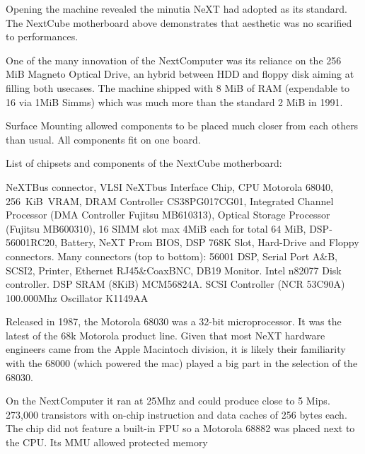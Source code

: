 \par
Opening the machine revealed the minutia NeXT had adopted as its standard. The NextCube motherboard above demonstrates that aesthetic was no scarified to performances.\\
\par
One of the many innovation of the NextComputer was its reliance on the 256 MiB Magneto Optical Drive, an hybrid between HDD and floppy disk aiming at filling both usecases. The machine shipped with 8 MiB of RAM (expendable to 16 via 1MiB Simms) which was much more than the standard 2 MiB in 1991.\\
\par
Surface Mounting allowed components to be placed much closer from each others than usual. All components fit on one board.

\vspace{50 mm}
\par
List of chipsets and components of the NextCube motherboard:\\
\par 
{} NeXTBus connector,
 VLSI NeXTbus Interface Chip,
 CPU Motorola 68040,
 256~KiB~VRAM,
 DRAM Controller CS38PG017CG01,
 Integrated Channel Processor (DMA Controller Fujitsu MB610313),
 Optical Storage Processor (Fujitsu MB600310),
 16 SIMM slot max 4MiB each for total 64 MiB,
 DSP-56001RC20,
 Battery,
 NeXT Prom BIOS,
 DSP 768K Slot,
 Hard-Drive and Floppy connectors.
 Many connectors (top to bottom): 56001 DSP, Serial Port A\&B, SCSI2, Printer, Ethernet RJ45\&CoaxBNC, DB19 Monitor. 
 Intel n82077 Disk controller.
 DSP SRAM (8KiB) MCM56824A.
 SCSI Controller (NCR 53C90A)
 100.000Mhz Oscillator K1149AA



\begin{figure}[H]
\centering
{}
\end{figure}
Released in 1987, the Motorola 68030 was a 32-bit microprocessor. It was the latest of the 68k Motorola product line. Given that most NeXT hardware engineers came from the Apple Macintoch division, it is likely their familiarity with the 68000 (which powered the mac) played a big part in the selection of the 68030.\\
\par
On the NextComputer it ran at 25Mhz and could produce close to 5 Mips. 273,000 transistors with on-chip instruction and data caches of 256 bytes each. The chip did not feature a built-in FPU so a Motorola 68882 was placed next to the CPU. Its MMU allowed protected memory 
\pagebreak
\par


